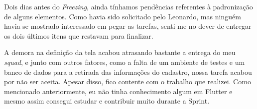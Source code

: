 Dois dias antes do \textit{Freezing}, ainda tínhamos pendências referentes à padronização de alguns elementos. Como havia sido solicitado pelo Leonardo, mas ninguém havia se mostrado interessado em pegar as tarefas, senti-me no dever de entregar os dois últimos itens que restavam para finalizar.

A demora na definição da tela acabou atrasando bastante a entrega do meu \textit{squad}, e junto com outros fatores, como a falta de um ambiente de testes e um banco de dados para a retirada das informações do cadastro, nossa tarefa acabou por não ser aceita. Apesar disso, fico contente com o trabalho que realizei. Como mencionado anteriormente, eu não tinha conhecimento algum em Flutter e mesmo assim consegui estudar e contribuir muito durante a Sprint.